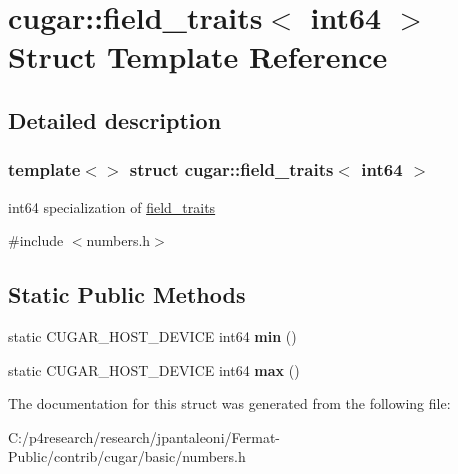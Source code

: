 \hypertarget{structcugar_1_1field__traits_3_01int64_01_4}{}\section{cugar\+:\+:field\+\_\+traits$<$ int64 $>$ Struct Template Reference}
\label{structcugar_1_1field__traits_3_01int64_01_4}


\subsection{Detailed description}
\subsubsection*{template$<$$>$\newline
struct cugar\+::field\+\_\+traits$<$ int64 $>$}

int64 specialization of \hyperlink{structcugar_1_1field__traits}{field\+\_\+traits} 

{\ttfamily \#include $<$numbers.\+h$>$}

\subsection*{Static Public Methods}
\begin{DoxyCompactItemize}
\item 
\mbox{\label{structcugar_1_1field__traits_3_01int64_01_4_a681b3e2ab5bb187f3ee2083ca3dfce0d}} 
static C\+U\+G\+A\+R\+\_\+\+H\+O\+S\+T\+\_\+\+D\+E\+V\+I\+CE int64 {\bfseries min} ()
\item 
\mbox{\label{structcugar_1_1field__traits_3_01int64_01_4_ae20f7124b1af355603e696a0e835c21d}} 
static C\+U\+G\+A\+R\+\_\+\+H\+O\+S\+T\+\_\+\+D\+E\+V\+I\+CE int64 {\bfseries max} ()
\end{DoxyCompactItemize}


The documentation for this struct was generated from the following file\+:\begin{DoxyCompactItemize}
\item 
C\+:/p4research/research/jpantaleoni/\+Fermat-\/\+Public/contrib/cugar/basic/numbers.\+h\end{DoxyCompactItemize}
